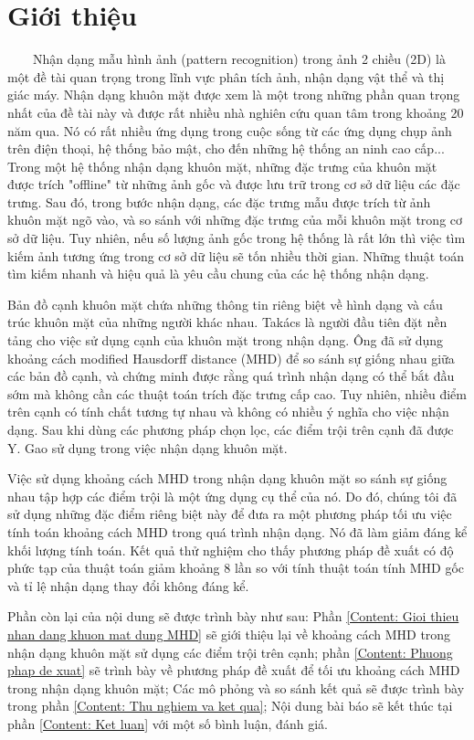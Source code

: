 \documentclass[runningheads]{llncs}
\begin{document}
\section{Giới thiệu}
\label{Content: Gioi thieu}
~~~~Nhận dạng mẫu hình ảnh (pattern recognition) trong ảnh 2 chiều (2D) là một đề tài quan trọng trong lĩnh vực phân tích ảnh, nhận dạng vật thể và thị giác máy. Nhận dạng khuôn mặt được xem là một trong những phần quan trọng nhất của đề tài này và được rất nhiều nhà nghiên cứu quan tâm trong khoảng 20 năm qua. Nó có rất nhiều ứng dụng trong cuộc sống từ các ứng dụng chụp ảnh trên điện thoại, hệ thống bảo mật, cho đến những hệ thống an ninh cao cấp... Trong một hệ thống nhận dạng khuôn mặt, những đặc trưng của khuôn mặt được trích "offline" từ những ảnh gốc và được lưu trữ trong cơ sở dữ liệu các đặc trưng. Sau đó, trong bước nhận dạng, các đặc trưng mẫu được trích từ ảnh khuôn mặt ngõ vào, và so sánh với những đặc trưng của mỗi khuôn mặt trong cơ sở dữ liệu. Tuy nhiên, nếu số lượng ảnh gốc trong hệ thống là rất lớn thì việc tìm kiếm ảnh tương ứng trong cơ sở dữ liệu sẽ tốn nhiều thời gian. Những thuật toán tìm kiếm nhanh và hiệu quả là yêu cầu chung của các hệ thống nhận dạng.

Bản đồ cạnh khuôn mặt chứa những thông tin riêng biệt về hình dạng và cấu trúc khuôn mặt của những người khác nhau. Takács \cite{takacs1998comparing} là người đầu tiên đặt nền tảng cho việc sử dụng cạnh của khuôn mặt trong nhận dạng. Ông đã sử dụng khoảng cách modified Hausdorff distance (MHD) để so sánh sự giống nhau giữa các bản đồ cạnh, và chứng minh được rằng quá trình nhận dạng có thể bắt đầu sớm mà không cần các thuật toán trích đặc trưng cấp cao. Tuy nhiên, nhiều điểm trên cạnh có tính chất tương tự nhau và không có nhiều ý nghĩa cho việc nhận dạng. Sau khi dùng các phương pháp chọn lọc, các điểm trội trên cạnh đã được Y. Gao \cite{gao2003efficiently} sử dụng trong việc nhận dạng khuôn mặt. 

Việc sử dụng khoảng cách MHD trong nhận dạng khuôn mặt so sánh sự giống nhau tập hợp các điểm trội là một ứng dụng cụ thể của nó. Do đó, chúng tôi đã sử dụng những đặc điểm riêng biệt này để đưa ra một phương pháp tối ưu việc tính toán khoảng cách MHD trong quá trình nhận dạng. Nó đã làm giảm đáng kể khối lượng tính toán. Kết quả thử nghiệm cho thấy phương pháp đề xuất có độ phức tạp của thuật toán giảm khoảng 8 lần so với tính thuật toán tính MHD gốc và tỉ lệ nhận dạng thay đổi không đáng kể.

Phần còn lại của nội dung sẽ được trình bày như sau: Phần \ref{Content: Gioi thieu nhan dang khuon mat dung MHD} sẽ giới thiệu lại về khoảng cách MHD trong nhận dạng khuôn mặt sử dụng các điểm trội trên cạnh; phần \ref{Content: Phuong phap de xuat} sẽ trình bày về phương pháp đề xuất để tối ưu khoảng cách MHD trong nhận dạng khuôn mặt; Các mô phỏng và so sánh kết quả sẽ được trình bày trong phần \ref{Content: Thu nghiem va ket qua}; Nội dung bài báo sẽ kết thúc tại phần \ref{Content: Ket luan} với một số bình luận, đánh giá.
\end{document}
